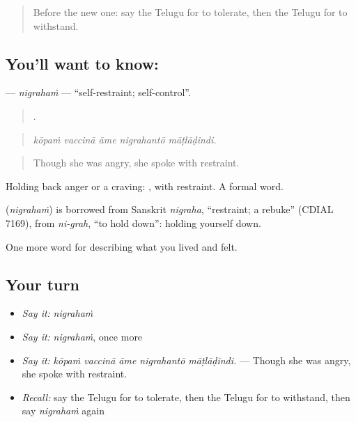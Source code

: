 \label{lesson:TE-C506-nigraham}



\begin{quote}
Before the new one: say the Telugu for to tolerate, then the Telugu for to withstand.
\end{quote}

\subsection*{You'll want to know: }
\textbf{} — \emph{nigrahaṁ} — \textquotedblleft{}self-restraint; self-control\textquotedblright{}.

\begin{quote}
    .
\end{quote}

\begin{quote}
\emph{kōpaṁ vaccinā āme nigrahantō māṭlāḍindi.}
\end{quote}

\begin{quote}
Though she was angry, she spoke with restraint.
\end{quote}

Holding back anger or a craving: , with restraint. A formal word.

\begin{cousinweb}
\textbf{} (\emph{nigrahaṁ}) is borrowed from Sanskrit \emph{nigraha}, \textquotedblleft{}restraint; a rebuke\textquotedblright{} (CDIAL 7169), from \emph{ni-grah}, \textquotedblleft{}to hold down\textquotedblright{}: holding yourself down.
\end{cousinweb}

\begin{grammarlens}[title={What you've built}]
One more word for describing what you lived and felt.
\end{grammarlens}

\subsection*{Your turn}
\begin{itemize}
\raggedright
  \item \emph{Say it:} \emph{nigrahaṁ}
  \item \emph{Say it:} \emph{nigrahaṁ}, once more
  \item \emph{Say it:} \emph{kōpaṁ vaccinā āme nigrahantō māṭlāḍindi.} — Though she was angry, she spoke with restraint.
  \item \emph{Recall:} say the Telugu for to tolerate, then the Telugu for to withstand, then say \emph{nigrahaṁ} again
\end{itemize}

